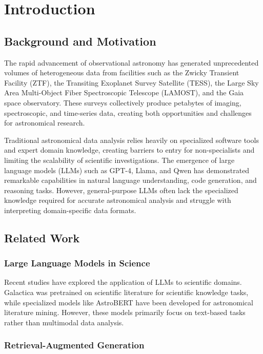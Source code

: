 \documentclass[11pt,a4paper]{article}
\begin{document}
\section{Introduction}\label{sec:introduction}

\subsection{Background and Motivation}

The rapid advancement of observational astronomy has generated unprecedented volumes of heterogeneous data from facilities such as the Zwicky Transient Facility (ZTF), the Transiting Exoplanet Survey Satellite (TESS), the Large Sky Area Multi-Object Fiber Spectroscopic Telescope (LAMOST), and the Gaia space observatory. These surveys collectively produce petabytes of imaging, spectroscopic, and time-series data, creating both opportunities and challenges for astronomical research.

Traditional astronomical data analysis relies heavily on specialized software tools and expert domain knowledge, creating barriers to entry for non-specialists and limiting the scalability of scientific investigations. The emergence of large language models (LLMs) such as GPT-4, Llama, and Qwen has demonstrated remarkable capabilities in natural language understanding, code generation, and reasoning tasks. However, general-purpose LLMs often lack the specialized knowledge required for accurate astronomical analysis and struggle with interpreting domain-specific data formats.

\subsection{Related Work}

\subsubsection{Large Language Models in Science}

Recent studies have explored the application of LLMs to scientific domains. Galactica was pretrained on scientific literature for scientific knowledge tasks, while specialized models like AstroBERT have been developed for astronomical literature mining. However, these models primarily focus on text-based tasks rather than multimodal data analysis.

\subsubsection{Retrieval-Augmented Generation}
\end{document}
